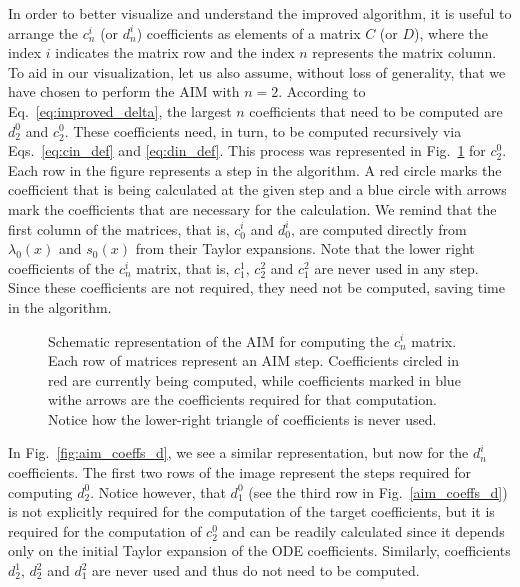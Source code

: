 In order to better visualize and understand the improved algorithm, it is useful to arrange the $c^i_n$ (or $d^i_n$) coefficients as elements of a matrix $C$ (or $D$), where the index $i$ indicates the matrix row and the index $n$ represents the matrix column. To aid in our visualization, let us also assume, without loss of generality, that we have chosen to perform the \ac{AIM} with $n=2$. According to Eq.~\eqref{eq:improved_delta}, the largest $n$ coefficients that need to be computed  are $d^0_2$ and $c^0_2$. These coefficients need, in turn, to be computed recursively via Eqs.~\eqref{eq:cin_def} and \eqref{eq:din_def}. This process was represented in Fig.~\ref{fig:aim_coeffs_c} for $c^0_2$. Each row in the figure represents a step in the algorithm. A red circle marks the coefficient that is being calculated at the given step and a blue circle with arrows mark the coefficients that are necessary for the calculation. We remind that the first column of the matrices, that is, $c^i_0$ and $d^i_0$, are computed directly from $\lambda_0(x)$ and $s_0(x)$ from their Taylor expansions. Note that the lower right coefficients of the $c^i_n$ matrix, that is, $c^1_1$, $c^2_2$ and $c^2_1$ are never used in any step. Since these coefficients are not required, they need not be computed, saving time in the algorithm.

\begin{figure}[!ht]
  \centering
  
  \caption{Schematic representation of the \ac{AIM} for computing the $c^i_n$ matrix. Each row of matrices represent an \ac{AIM} step. Coefficients circled in red are currently being computed, while coefficients marked in blue withe arrows are the coefficients required for that computation. Notice how the lower-right triangle of coefficients is never used.}
  \label{fig:aim_coeffs_c}
\end{figure}

In  Fig.~\ref{fig:aim_coeffs_d}, we see a similar representation, but now for the $d^i_n$ coefficients. The first two rows of the image represent the steps required for computing $d^0_2$. Notice however, that $d^0_1$ (see the third row in Fig.~\ref{aim_coeffs_d}) is not explicitly required for the computation of the target coefficients, but it is required for the computation of $c^0_2$ and can be readily calculated since it depends only on the initial Taylor expansion of the \ac{ODE} coefficients. Similarly, coefficients $d^1_2$, $d^2_2$ and $d^2_1$ are never used and thus do not need to be computed.

